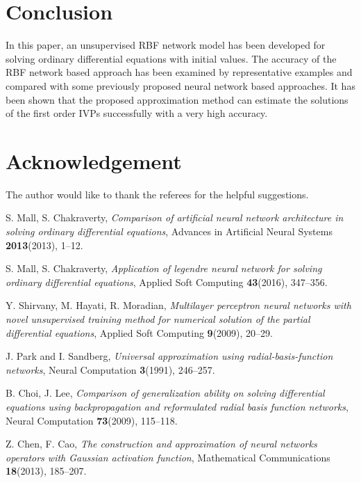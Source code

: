 \documentclass{mc}
\begin{document}
\section{Conclusion}

In this paper, an unsupervised RBF network model has been developed for solving ordinary differential equations with initial values. The accuracy of the RBF network based approach has been examined by representative examples and compared with some previously proposed neural network based approaches. It has been shown that the proposed approximation method can estimate the solutions of the first order IVPs successfully with a very high accuracy.



\section*{Acknowledgement}
The author would like to thank the referees for the helpful
suggestions.

\begin{thebibliography}{99}

 {\sc S. Mall, S. Chakraverty}, {\em Comparison of artificial neural network architecture in solving ordinary differential equations},
 Advances in Artificial Neural Systems {\bf 2013}(2013), 1--12.

 {\sc S. Mall, S. Chakraverty}, {\em Application of legendre neural network for solving ordinary differential equations}, Applied Soft Computing {\bf 43}(2016), 347--356.
 
 {\sc Y. Shirvany, M. Hayati, R. Moradian}, {\em Multilayer perceptron neural networks with novel unsupervised training method for numerical solution of the partial differential equations}, Applied Soft Computing {\bf 9}(2009), 20--29.
 
 {\sc J. Park and I. Sandberg}, {\em Universal approximation using radial-basis-function networks},
 Neural Computation {\bf 3}(1991), 246--257.
 
 {\sc B. Choi, J. Lee}, {\em Comparison of generalization ability on solving differential equations using backpropagation and reformulated radial basis function networks},
 Neural Computation {\bf 73}(2009), 115--118.
 
 {\sc Z. Chen, F. Cao}, {\em The construction and approximation of neural networks operators with Gaussian activation function},
 Mathematical Communications {\bf 18}(2013), 185--207.
 
 \end{thebibliography}
\end{document}

